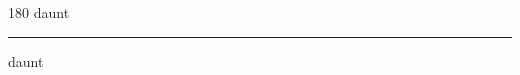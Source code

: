 
\begin{frame}
\begin{center}
\begin{turn}{180}
{\fontsize{2.5cm}{1em}\selectfont daunt}
\end{turn}
\vspace{1em}\par  
\hrule
\vspace{1em}\par  
{\fontsize{2.5cm}{1em}\selectfont daunt}
\end{center}
\end{frame}
